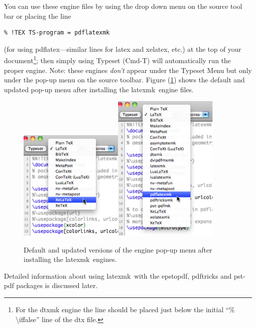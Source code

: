 \documentclass[11pt]{article}
\newcommand{\cmdkey}{\textsf{Cmd}}
\newcommand{\mnu}[1]{\textsf{#1}}
\newcommand{\cmd}[1]{\textsf{#1}}
\newcommand{\latexmk}{\textsf{latexmk}}
\begin{document}
You can use these \cmd{engine} files by using the drop down menu on the source tool bar or placing the line
\begin{verbatim}
% !TEX TS-program = pdflatexmk
\end{verbatim}
(for using \cmd{pdflatex}---similar lines for \cmd{latex} and \cmd{xelatex}, etc.) at the top of your document\footnote{For the dtxmk engine the line should be placed just below the initial ``\cmd{\% \textbackslash iffalse}'' line of the \cmd{dtx} file.}; then simply using \mnu{Typeset} (\cmd{\cmdkey-T}) will automatically run the proper \cmd{engine}. Note: these engines \emph{don't} appear under the \mnu{Typeset} Menu but only under the pop-up menu on the source toolbar. Figure (\ref{fig:popupmenus}) shows the default and updated pop-up menu after installing the \latexmk\ engine files.
\begin{figure}
\centering
\includegraphics[width=2in]{zfigs/OriginalTypesetPopup}\qquad\includegraphics[width=2in]{zfigs/UpdatedTypesetPopup}
\caption{Default and updated versions of the engine pop-up menu after installing the \latexmk\ engines.}\label{fig:popupmenus}
\end{figure}

Detailed information about using \latexmk\ with the \cmd{epstopdf}, \cmd{pdftricks} and \cmd{pst-pdf} packages is discussed later.
\end{document}
